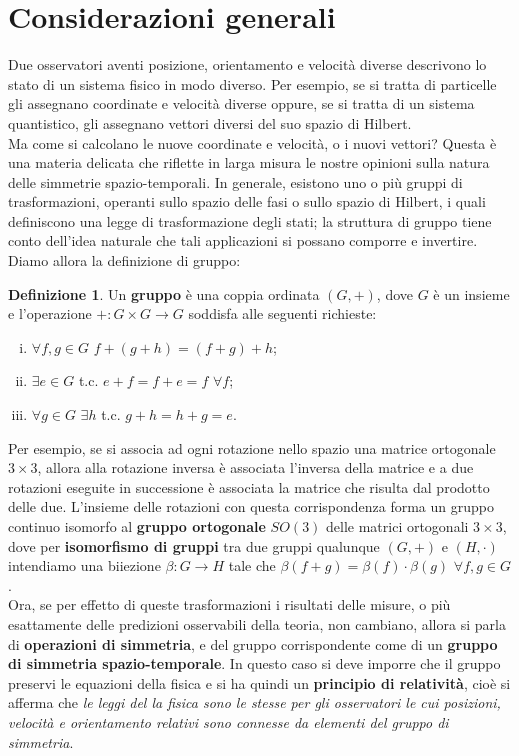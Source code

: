 \documentclass[a4paper,11pt]{book}
\theoremstyle{plain}
\theoremstyle{definition}
\newtheorem{defn}{Definizione}[chapter]
\begin{document}
\section{Considerazioni generali}
Due osservatori aventi posizione, orientamento e velocità 
diverse descrivono lo stato di 
un sistema fisico in modo diverso. Per esempio, se si tratta di particelle gli assegnano 
coordinate e velocità diverse oppure, se si tratta di un sistema quantistico, gli assegnano 
vettori diversi del suo spazio di Hilbert. \\
Ma come si calcolano le nuove coordinate e velocità, o i nuovi vettori? Questa è una 
materia delicata che riflette in larga misura le nostre opinioni sulla natura delle simmetrie 
spazio-temporali. In generale, esistono uno o più gruppi di trasformazioni, operanti sullo 
spazio delle fasi o sullo spazio di Hilbert, i quali definiscono una legge di trasformazione 
degli stati; la struttura di gruppo tiene conto dell'idea naturale che tali applicazioni si 
possano comporre e invertire. Diamo allora la definizione di gruppo:
\begin{defn}
Un \textbf{gruppo} è una coppia ordinata $(G,+)$, dove $G$ è un insieme e l'operazione $+:G\times G\to G$ soddisfa alle seguenti richieste:
\begin{enumerate}[i.]
	\item $\forall f,g\in G $ $f+(g+h)=(f+g)+h$;
	\item $\exists e\in G$ t.c. $e+f=f+e=f$ $\forall f$;
	\item $\forall g \in G$ $\exists h$ t.c. $g+h=h+g=e$.
\end{enumerate}
\end{defn}
Per esempio, se si associa ad ogni rotazione nello spazio una matrice ortogonale $3\times 3$, allora alla rotazione inversa è associata l'inversa della matrice e a due rotazioni eseguite in successione è associata la matrice che risulta dal prodotto delle due. L'insieme delle rotazioni con questa corrispondenza forma un gruppo continuo isomorfo al \textbf{gruppo ortogonale} $SO(3)$ delle matrici ortogonali $3\times 3$, dove per \textbf{isomorfismo di gruppi} tra due gruppi qualunque $(G,+)$ e $(H,\cdot)$ intendiamo una biiezione $\beta:G\to H$ tale che $\beta(f+g)=\beta(f)\cdot\beta(g)$ $\forall f,g\in G$. \\
Ora, se per effetto di queste trasformazioni i risultati delle misure, o più esattamente delle 
predizioni osservabili della teoria, non cambiano, allora si parla di \textbf{operazioni di simmetria}, 
e del gruppo corrispondente come di un \textbf{gruppo di simmetria spazio-temporale}. In questo caso si deve imporre che il gruppo preservi le equazioni della fisica e si ha quindi un \textbf{principio di relatività}, cioè si afferma che \emph{le leggi del la fisica sono le 
stesse per gli osservatori le cui posizioni, velocità e orientamento relativi sono connesse 
da elementi del gruppo di simmetria}. \\
\end{document}
